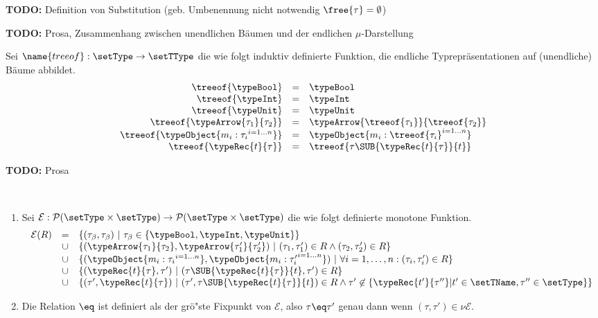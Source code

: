 {\bf TODO:} Definition von Substitution (geb. Umbenennung nicht notwendig $\free{\tau}=\emptyset$)

{\bf TODO:} Prosa, Zusammenhang zwischen unendlichen B\"aumen und der endlichen $\mu$-Darstellung

\begin{definition} \label{definition:Lort:treeof}
  Sei $\name{treeof}: \setType \to \setTType$ die wie folgt induktiv definierte Funktion, die
  endliche Typrepr\"asentationen auf (unendliche) B\"aume abbildet.
  \[\begin{array}{rcl}
    \treeof{\typeBool} & = & \typeBool \\
    \treeof{\typeInt} & = & \typeInt \\
    \treeof{\typeUnit} & = & \typeUnit \\
    \treeof{\typeArrow{\tau_1}{\tau_2}} & = & \typeArrow{\treeof{\tau_1}}{\treeof{\tau_2}} \\
    \treeof{\typeObject{{m_i:\tau_i}^{i=1 \ldots n}}} & = & \typeObject{{m_i:\treeof{\tau_i}}^{i=1 \ldots n}} \\
    \treeof{\typeRec{t}{\tau}} & = & \treeof{\tau\SUB{\typeRec{t}{\tau}}{t}}
  \end{array}\]
\end{definition}

{\bf TODO:} Prosa

\begin{definition} \label{definition:Lort:Typgleichheit} \
  \begin{enumerate}
    \item Sei $\mathcal{E}: \mathcal{P}(\setType\times\setType) \to \mathcal{P}(\setType\times\setType)$ die
          wie folgt definierte monotone Funktion.
          \[\begin{array}{rcl}
            \mathcal{E}(R) & =  & \{(\tau_\beta,\tau_\beta)\ |\ \tau_\beta \in \{\typeBool,\typeInt,\typeUnit\}\} \\
                  &\cup& \{(\typeArrow{\tau_1}{\tau_2},\typeArrow{\tau_1'}{\tau_2'})\ |\ (\tau_1,\tau_1')\in R \wedge
                           (\tau_2,\tau_2')\in R\} \\
                  &\cup& \{(\typeObject{{m_i:\tau_i}^{i=1 \ldots n}},\typeObject{{m_i:\tau_i'}^{i=1 \ldots n}})\ |\ 
                           \forall i=1,\ldots,n:(\tau_i,\tau_i')\in R\} \\
                  &\cup& \{(\typeRec{t}{\tau},\tau')\ |\ (\tau\SUB{\typeRec{t}{\tau}}{t},\tau')\in R\} \\
                  &\cup& \{(\tau',\typeRec{t}{\tau})\ |\ (\tau',\tau\SUB{\typeRec{t}{\tau}}{t})\in R \wedge
                           \tau'\not\in\{\typeRec{t'}{\tau''}|t'\in\setTName,\tau''\in\setType\}\}
          \end{array}\]

    \item Die Relation $\eq$ ist definiert als der gr\"o"ste Fixpunkt von $\mathcal{E}$, also $\tau \eq \tau'$ genau
          dann wenn $(\tau,\tau')\in\nu \mathcal{E}$.
  \end{enumerate}
\end{definition}

